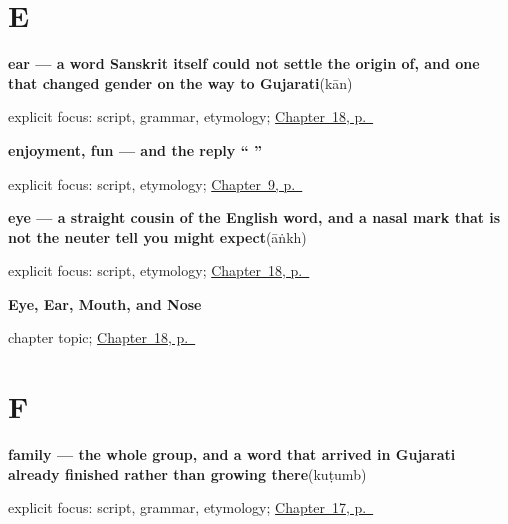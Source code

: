 \section*{E}

\noindent\begin{minipage}[t]{\linewidth}
\raggedright
\textbf{ear — a word Sanskrit itself could not settle the origin of, and one that changed gender on the way to Gujarati}\enspace\emph{}\enspace(kān)\par
\footnotesize explicit focus: script, grammar, etymology; \hyperref[ch:gu-face-parts]{Chapter~18, p.~\pageref*{ch:gu-face-parts}}
\end{minipage}\par\smallskip

\noindent\begin{minipage}[t]{\linewidth}
\raggedright
\textbf{enjoyment, fun — and the reply \textquotedblleft{}  \textquotedblright{}}\enspace\emph{}\par
\footnotesize explicit focus: script, etymology; \hyperref[ch:responding]{Chapter~9, p.~\pageref*{ch:responding}}
\end{minipage}\par\smallskip

\noindent\begin{minipage}[t]{\linewidth}
\raggedright
\textbf{eye — a straight cousin of the English word, and a nasal mark that is not the neuter tell you might expect}\enspace\emph{}\enspace(āṅkh)\par
\footnotesize explicit focus: script, etymology; \hyperref[ch:gu-face-parts]{Chapter~18, p.~\pageref*{ch:gu-face-parts}}
\end{minipage}\par\smallskip

\noindent\begin{minipage}[t]{\linewidth}
\raggedright
\textbf{Eye, Ear, Mouth, and Nose}\par
\footnotesize chapter topic; \hyperref[ch:gu-face-parts]{Chapter~18, p.~\pageref*{ch:gu-face-parts}}
\end{minipage}\par\smallskip

\section*{F}

\noindent\begin{minipage}[t]{\linewidth}
\raggedright
\textbf{family — the whole group, and a word that arrived in Gujarati already finished rather than growing there}\enspace\emph{}\enspace(kuṭumb)\par
\footnotesize explicit focus: script, grammar, etymology; \hyperref[ch:gu-friend-and-family]{Chapter~17, p.~\pageref*{ch:gu-friend-and-family}}
\end{minipage}\par\smallskip

